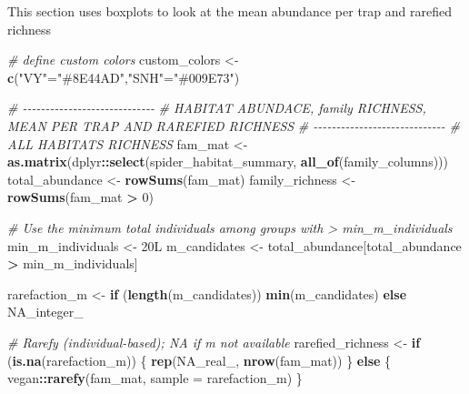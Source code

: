\documentclass[
]{article}
\newenvironment{Shaded}{\begin{snugshade}}{\end{snugshade}}
\newcommand{\AttributeTok}[1]{\textcolor[rgb]{0.13,0.29,0.53}{#1}}
\newcommand{\CommentTok}[1]{\textcolor[rgb]{0.56,0.35,0.01}{\textit{#1}}}
\newcommand{\ConstantTok}[1]{\textcolor[rgb]{0.56,0.35,0.01}{#1}}
\newcommand{\ControlFlowTok}[1]{\textcolor[rgb]{0.13,0.29,0.53}{\textbf{#1}}}
\newcommand{\DataTypeTok}[1]{\textcolor[rgb]{0.13,0.29,0.53}{#1}}
\newcommand{\DecValTok}[1]{\textcolor[rgb]{0.00,0.00,0.81}{#1}}
\newcommand{\FunctionTok}[1]{\textcolor[rgb]{0.13,0.29,0.53}{\textbf{#1}}}
\newcommand{\NormalTok}[1]{#1}
\newcommand{\OtherTok}[1]{\textcolor[rgb]{0.56,0.35,0.01}{#1}}
\newcommand{\SpecialCharTok}[1]{\textcolor[rgb]{0.81,0.36,0.00}{\textbf{#1}}}
\newcommand{\StringTok}[1]{\textcolor[rgb]{0.31,0.60,0.02}{#1}}
\begin{document}
This section uses boxplots to look at the mean abundance per trap and
rarefied richness

\begin{Shaded}
\begin{Highlighting}[]
\CommentTok{\# define custom colors}
\NormalTok{custom\_colors }\OtherTok{\textless{}{-}} \FunctionTok{c}\NormalTok{(}\StringTok{"VY"}\OtherTok{=}\StringTok{"\#8E44AD"}\NormalTok{,}\StringTok{"SNH"}\OtherTok{=}\StringTok{"\#009E73"}\NormalTok{)}

\CommentTok{\# {-}{-}{-}{-}{-}{-}{-}{-}{-}{-}{-}{-}{-}{-}{-}{-}{-}{-}{-}{-}{-}{-}{-}{-}{-}{-}{-}{-}{-}}
\CommentTok{\# HABITAT ABUNDACE, family RICHNESS, MEAN PER TRAP AND RAREFIED RICHNESS}
\CommentTok{\# {-}{-}{-}{-}{-}{-}{-}{-}{-}{-}{-}{-}{-}{-}{-}{-}{-}{-}{-}{-}{-}{-}{-}{-}{-}{-}{-}{-}{-}}
\CommentTok{\# ALL HABITATS RICHNESS}
\NormalTok{fam\_mat            }\OtherTok{\textless{}{-}} \FunctionTok{as.matrix}\NormalTok{(dplyr}\SpecialCharTok{::}\FunctionTok{select}\NormalTok{(spider\_habitat\_summary, }\FunctionTok{all\_of}\NormalTok{(family\_columns)))}
\NormalTok{total\_abundance   }\OtherTok{\textless{}{-}} \FunctionTok{rowSums}\NormalTok{(fam\_mat)}
\NormalTok{family\_richness  }\OtherTok{\textless{}{-}} \FunctionTok{rowSums}\NormalTok{(fam\_mat }\SpecialCharTok{\textgreater{}} \DecValTok{0}\NormalTok{)}

\CommentTok{\#   Use the minimum total individuals among groups with \textgreater{} min\_m\_individuals}
\NormalTok{min\_m\_individuals }\OtherTok{\textless{}{-}} \DecValTok{20}\DataTypeTok{L}
\NormalTok{m\_candidates      }\OtherTok{\textless{}{-}}\NormalTok{ total\_abundance[total\_abundance }\SpecialCharTok{\textgreater{}}\NormalTok{ min\_m\_individuals]}

\NormalTok{rarefaction\_m }\OtherTok{\textless{}{-}} \ControlFlowTok{if}\NormalTok{ (}\FunctionTok{length}\NormalTok{(m\_candidates)) }\FunctionTok{min}\NormalTok{(m\_candidates) }\ControlFlowTok{else} \ConstantTok{NA\_integer\_}

\CommentTok{\# Rarefy (individual{-}based); NA if m not available}
\NormalTok{rarefied\_richness }\OtherTok{\textless{}{-}} \ControlFlowTok{if}\NormalTok{ (}\FunctionTok{is.na}\NormalTok{(rarefaction\_m)) \{}
  \FunctionTok{rep}\NormalTok{(}\ConstantTok{NA\_real\_}\NormalTok{, }\FunctionTok{nrow}\NormalTok{(fam\_mat))}
\NormalTok{\} }\ControlFlowTok{else}\NormalTok{ \{}
\NormalTok{  vegan}\SpecialCharTok{::}\FunctionTok{rarefy}\NormalTok{(fam\_mat, }\AttributeTok{sample =}\NormalTok{ rarefaction\_m)}
\NormalTok{\}}


\end{Highlighting}
\end{Shaded}
\end{document}
